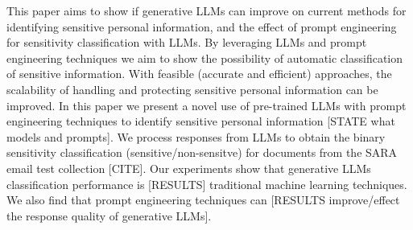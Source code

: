 This paper aims to show if generative LLMs can improve on current methods for identifying sensitive personal information, and the effect of prompt engineering for sensitivity classification with LLMs. By leveraging LLMs and prompt engineering techniques we aim to show the possibility of automatic classification of sensitive information. With feasible (accurate and efficient) approaches, the scalability of handling and protecting sensitive personal information can be improved. In this paper we present a novel use of pre-trained LLMs with prompt engineering techniques to identify sensitive personal information [STATE what models and prompts]. We process responses from LLMs to obtain the binary sensitivity classification (sensitive/non-sensitve) for documents from the SARA email test collection [CITE]. Our experiments show that generative LLMs classification performance is [RESULTS] traditional machine learning techniques. We also find that prompt engineering techniques can [RESULTS improve/effect the response quality of generative LLMs].

